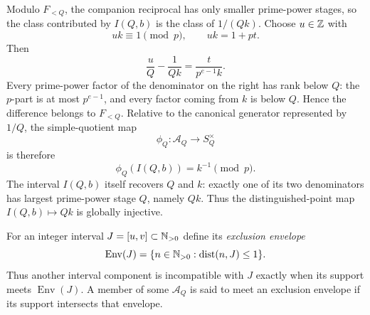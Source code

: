 Modulo $F_{<Q}$, the companion reciprocal has only smaller prime-power stages, so the class contributed by $I(Q,b)$ is the class of $1/(Qk)$.  Choose $u\in\mathbb Z$ with
\[
uk\equiv1\pmod p,
\qquad uk=1+pt.
\]
Then
\begin{equation}\label{eq:simple-coordinate-calculation}
\frac{u}{Q}-\frac1{Qk}
=\frac{t}{p^{e-1}k}.
\end{equation}
Every prime-power factor of the denominator on the right has rank below $Q$: the $p$-part is at most $p^{e-1}$, and every factor coming from $k$ is below $Q$.  Hence the difference belongs to $F_{<Q}$.  Relative to the canonical generator represented by $1/Q$, the simple-quotient map
\[
\phi_Q:\mathcal A_Q\longrightarrow S_Q^\times
\]
is therefore
\begin{equation}\label{eq:simple-value}
\phi_Q(I(Q,b))=k^{-1}\pmod p.
\end{equation}
The interval $I(Q,b)$ itself recovers $Q$ and $k$: exactly one of its two denominators has largest prime-power stage $Q$, namely $Qk$.  Thus the distinguished-point map $I(Q,b)\mapsto Qk$ is globally injective.

For an integer interval $J=[u,v]\subset\mathbb N_{>0}$ define its \emph{exclusion envelope}
\[
\operatorname{Env}(J)
=\{n\in\mathbb N_{>0}:\operatorname{dist}(n,J)\le1\}.
\]
Thus another interval component is incompatible with $J$ exactly when its support meets $\operatorname{Env}(J)$.  A member of some $\mathcal A_Q$ is said to meet an exclusion envelope if its support intersects that envelope.

